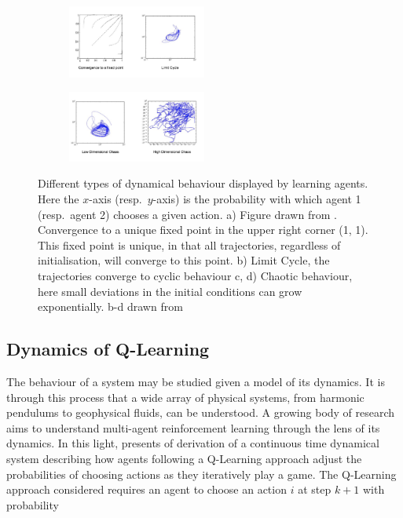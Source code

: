 \documentclass[sigconf,anonymous]{aamas}
\begin{document}
    \begin{figure}[h]
        \centering
        
        \begin{subfigure}[b]{0.9 \textwidth}
        \includegraphics[width=0.5\textwidth]{Figures/DynamicalBehavioursTop.png}
        \end{subfigure}
        
        \begin{subfigure}[b]{0.9 \textwidth}
        \includegraphics[width=0.5\textwidth]{Figures/DynamicalBehaviourschaos.png}
        \end{subfigure}
        
        \caption{ \label{fig::DynamicalBehaviours} Different types of dynamical behaviour
       displayed
        by learning agents. Here the $x$-axis (resp.~$y$-axis) is the probability with which agent 1 (resp.~agent 2) chooses a given action. a) Figure drawn from \cite{Tuyls2006AnGames}.
        Convergence
        to a unique fixed point in the upper right corner (1, 1). This fixed point is unique, in
        that all trajectories, regardless of initialisation, will converge to this point. b) Limit Cycle, the trajectories converge to cyclic behaviour c,
        d) Chaotic behaviour, here small deviations in the initial conditions can grow
        exponentially. b-d drawn from \cite{Sanders2018}}

    \end{figure}

\subsection{Dynamics of Q-Learning}

The behaviour of a system may be studied given a model of its
dynamics. It is through this process that a wide array of physical
systems, from harmonic pendulums to geophysical fluids, can be
understood. A growing body of research aims to understand
multi-agent reinforcement learning through the lens of its
dynamics. In this light, \cite{Tuyls2006AnGames} presents of derivation of a continuous time dynamical
system describing how agents following a Q-Learning approach adjust the probabilities of choosing actions
as they iteratively play a game. The Q-Learning approach considered requires an agent to choose an action $i$ at step $k+1$ with probability
\end{document}
